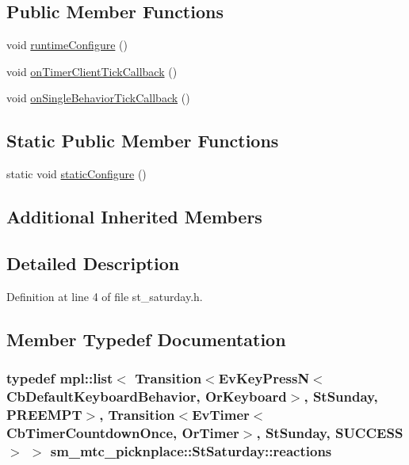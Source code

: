\subsection*{Public Member Functions}
\begin{DoxyCompactItemize}
\item 
void \hyperlink{structsm__mtc__picknplace_1_1StSaturday_ae0cae2aafe7f8691d0fa7452d4b9c4a2}{runtime\+Configure} ()
\item 
void \hyperlink{structsm__mtc__picknplace_1_1StSaturday_aa3b0a55541790c5b6ae5e92142927482}{on\+Timer\+Client\+Tick\+Callback} ()
\item 
void \hyperlink{structsm__mtc__picknplace_1_1StSaturday_ab9984036ff236ec2894cb8ad18607786}{on\+Single\+Behavior\+Tick\+Callback} ()
\end{DoxyCompactItemize}
\subsection*{Static Public Member Functions}
\begin{DoxyCompactItemize}
\item 
static void \hyperlink{structsm__mtc__picknplace_1_1StSaturday_abd696e1227bdcefc76a82e9acd946a3e}{static\+Configure} ()
\end{DoxyCompactItemize}
\subsection*{Additional Inherited Members}


\subsection{Detailed Description}


Definition at line 4 of file st\+\_\+saturday.\+h.



\subsection{Member Typedef Documentation}
\subsubsection[{\texorpdfstring{reactions}{reactions}}]{\setlength{\rightskip}{0pt plus 5cm}typedef mpl\+::list$<$ Transition$<$Ev\+Key\+PressN$<$Cb\+Default\+Keyboard\+Behavior, {\bf Or\+Keyboard}$>$, {\bf St\+Sunday}, {\bf P\+R\+E\+E\+M\+PT}$>$, Transition$<$Ev\+Timer$<$Cb\+Timer\+Countdown\+Once, {\bf Or\+Timer}$>$, {\bf St\+Sunday}, {\bf S\+U\+C\+C\+E\+SS}$>$ $>$ {\bf sm\+\_\+mtc\+\_\+picknplace\+::\+St\+Saturday\+::reactions}}\hypertarget{structsm__mtc__picknplace_1_1StSaturday_a12c8103770d6d52191db3690f245cf21}{}\label{structsm__mtc__picknplace_1_1StSaturday_a12c8103770d6d52191db3690f245cf21}


